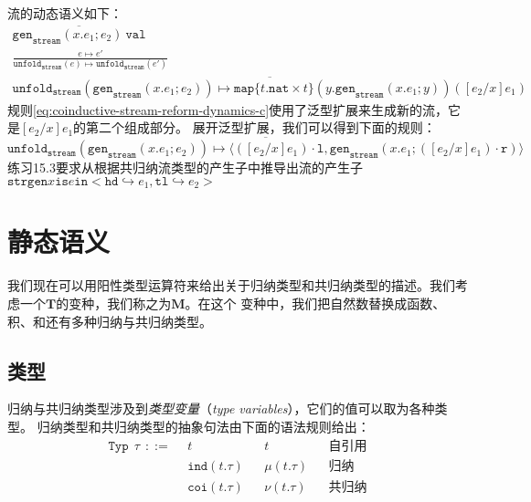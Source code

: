 流的动态语义如下：
\begin{subequations}\label{eq:coinductive-stream-reform-dynamics}
	\begin{gather}
	\overline{\texttt{gen}_\texttt{stream}(x.e_1;e_2)\ \texttt{val}} \label{eq:coinductive-stream-reform-dynamics-a}\\
	\frac{e\mapsto e'}{\texttt{unfold}_\texttt{stream}(e)\mapsto\texttt{unfold}_\texttt{stream}(e')} \label{eq:coinductive-stream-reform-dynamics-b}\\
	\overline{\texttt{unfold}_\texttt{stream}(\texttt{gen}_\texttt{stream}(x.e_1;e_2))
	\mapsto \texttt{map}\{t.\texttt{nat}\times t\}(y.\texttt{gen}_\texttt{stream}(x.e_1;y))([e_2/x]e_1)}\label{eq:coinductive-stream-reform-dynamics-c}
	\end{gather}
\end{subequations}
规则\ref{eq:coinductive-stream-reform-dynamics-c}使用了泛型扩展来生成新的流，它是$[e_2/x]e_1$的第二个组成部分。
展开泛型扩展，我们可以得到下面的规则：
$$\overline{\texttt{unfold}_\texttt{stream}(\texttt{gen}_\texttt{stream}(x.e_1;e_2))
\mapsto\langle([e_2/x]e_1)\cdot\texttt{l},\texttt{gen}_\texttt{stream}(x.e_1;([e_2/x]e_1)\cdot\texttt{r})\rangle}$$
练习15.3要求从根据共归纳流类型的产生子中推导出流的产生子$\texttt{strgen}x\texttt{is}e\texttt{in}<\texttt{hd}\hookrightarrow e_1,
\texttt{tl}\hookrightarrow e_2>$

\section{静态语义}

我们现在可以用阳性类型运算符来给出关于归纳类型和共归纳类型的描述。我们考虑一个$\textbf{T}$的变种，我们称之为$\textbf{M}$。在这个
变种中，我们把自然数替换成函数、积、和还有多种归纳与共归纳类型。

\subsection{类型}
归纳与共归纳类型涉及到\textit{类型变量}（\textit{type variables}），它们的值可以取为各种类型。
归纳类型和共归纳类型的抽象句法由下面的语法规则给出：
\begin{align*}
	\texttt{Typ}\ \ \tau\ \ ::=\ \ &t & &t & &\text{自引用} \\
	&\texttt{ind}(t.\tau) & &\mu(t.\tau) & &\text{归纳} \\
	&\texttt{coi}(t.\tau) & &\nu(t.\tau) & &\text{共归纳}
\end{align*}

